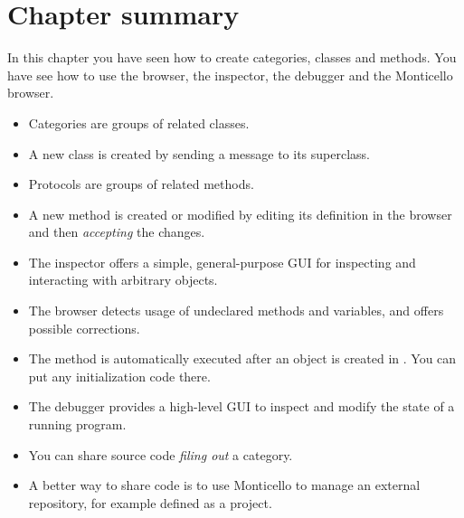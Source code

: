 \documentclass[a4paper,10pt,twoside]{book}
\begin{document}
\section{Chapter summary}
In this chapter you have seen how to create categories, classes and methods.  You have see how to use the browser, the inspector, the debugger and the Monticello browser.

\begin{itemize}
  \item Categories are groups of related classes.
  \item A new class is created by sending a message to its superclass.
  \item Protocols are groups of related methods.
  \item A new method is created or modified by editing its definition in the browser and then \emph{accepting} the changes.
  \item The inspector offers a simple, general-purpose GUI for inspecting and interacting with arbitrary objects.
  \item The browser detects usage of undeclared methods and variables, and offers possible corrections.
  \item The  method is automatically executed after an object is created in \pharo. You can put any initialization code there.
  \item The debugger provides a high-level GUI to inspect and modify the state of a running program.
  \item You can share source code \emph{filing out} a category.
  \item A better way to share code is to use Monticello to manage an external repository, for example defined as a \sqsrc project.
\end{itemize}

\ifx\wholebook\relax\else
\end{document}
